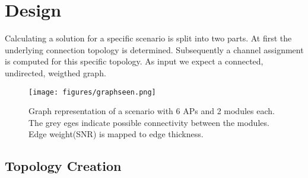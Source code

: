 \chapter{Design}
Calculating a solution for a specific scenario is split into two parts. At first the underlying connection topology is determined.
Subsequently a channel assignment is computed for this specific topology. As input we expect a connected, undirected, weigthed graph.
  \begin{figure}[htbp]
    \centering
    \texttt{[image: figures/graphseen.png]}
    \caption{Graph representation of a scenario with 6 APs and 2 modules each. The grey eges indicate possible connectivity between the 
    modules. Edge weight(SNR) is mapped to edge thickness.}
    \label{fig:graphseen}
  \end{figure}
\section{Topology Creation}
